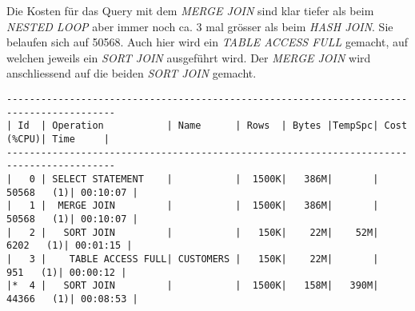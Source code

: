 \documentclass[11pt,a4paper,parskip=half]{scrartcl}
\begin{document}
Die Kosten für das Query mit dem \emph{MERGE JOIN} sind klar tiefer als beim \emph{NESTED LOOP} aber immer noch ca. 3 mal grösser als beim \emph{HASH JOIN}. Sie belaufen sich auf 50568. Auch hier wird ein \emph{TABLE ACCESS FULL} gemacht, auf welchen jeweils ein \emph{SORT JOIN} ausgeführt wird. Der \emph{MERGE JOIN} wird anschliessend auf die beiden \emph{SORT JOIN} gemacht.
\begin{lstlisting}
-----------------------------------------------------------------------------------------                                                                                                                                                                                                                    
| Id  | Operation           | Name      | Rows  | Bytes |TempSpc| Cost (%CPU)| Time     |                                                                                                                                                                                                                    
-----------------------------------------------------------------------------------------                                                                                                                                                                                                                    
|   0 | SELECT STATEMENT    |           |  1500K|   386M|       | 50568   (1)| 00:10:07 |                                                                                                                                                                                                                    
|   1 |  MERGE JOIN         |           |  1500K|   386M|       | 50568   (1)| 00:10:07 |                                                                                                                                                                                                                    
|   2 |   SORT JOIN         |           |   150K|    22M|    52M|  6202   (1)| 00:01:15 |                                                                                                                                                                                                                    
|   3 |    TABLE ACCESS FULL| CUSTOMERS |   150K|    22M|       |   951   (1)| 00:00:12 |                                                                                                                                                                                                                    
|*  4 |   SORT JOIN         |           |  1500K|   158M|   390M| 44366   (1)| 00:08:53 |                                                                                                                                                                                                                    

\end{lstlisting}
\end{document}

